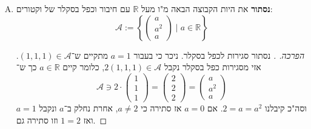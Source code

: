 \documentclass[]{article}
\newcommand\R     {\mathbb{R}}
\newcommand\ac    {\mathcal{A}}
\newcommand\pms[1]    {\begin{pmatrix}
		#1
\end{pmatrix}}
\renewcommand\lg      {\lambda}
\newcommand\ccb[1]    {\left \{ #1 \right \}}
\theoremstyle{definition}
\begin{document}
\begin{enumerate}[(A)]
\begin{proof}
\begin{itemize}
				\item \textit{קיום $0$:} מסגירות כפל ובפרט בעבור כפל ב־$\lg = 0$. 
			\end{itemize}
			סה"כ $\ac$ תמ"ו של $\R^3$ ובפרט מ"ו. 
		\end{proof}
		\item \textbf{נסתור} את היות הקבוצה הבאה מ"ו מעל $\R$ עם חיבור וכפל בסקלר של וקטורים: 
		\[ \ac := \ccb{\pms{a \\ a^2 \\ a} \mid a \in \R} \]
		\begin{proof}[הפרכה. ]
			נסתור סגירות לכפל בסקלר. ניכר כי בעבור $a = 1$ מתקיים ש־$(1, 1, 1) \in \ac$. אזי מסגירות כפל בסקלר נקבל $2(1, 1, 1) \in \ac$, כלומר קיים $a \in \R$ כך ש־
			\[ \ac \ni 2 \cdot \pms{1 \\ 1 \\ 1} = \pms{2 \\ 2 \\ 2} = \pms{a \\ a^2 \\ a} \]
			וסה"כ קיבלנו $2 = a = a^2$. אם $a = 0$ אז סתירה כי $a \neq 2$, אחרת נחלק ב־$a$ ונקבל $a = 1$ ואז $1 = 2$ וזו סתירה גם. 
		\end{proof}
	\end{enumerate}
	
\end{document}
